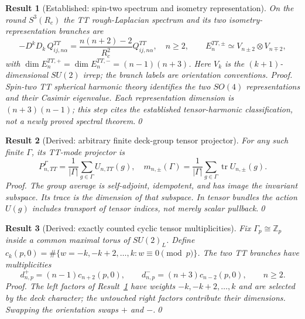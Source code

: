 \documentclass[aps,prd,onecolumn,notitlepage,groupedaddress,11pt]{revtex4-2}
\newtheorem{result}{Result}
\begin{document}
\begin{result}[\textsf{Established}: spin-two spectrum and isometry representation]\label{new:194}
On the round $S^3(R_c)$ the TT rough-Laplacian spectrum and its two isometry-representation branches are
\begin{equation}\label{eq:tt-spectrum}
 -D^kD_k\,Q^{TT}_{ij,n\alpha}=\frac{n(n+2)-2}{R_c^2}Q^{TT}_{ij,n\alpha},\quad n\ge2,\qquad
 E_n^{TT,\pm}\simeq V_{n\pm2}\otimes V_{n\mp2},
\end{equation}
with $\dim E_n^{TT,+}=\dim E_n^{TT,-}=(n-1)(n+3)$. Here $V_k$ is the $(k+1)$-dimensional $SU(2)$ irrep; the branch labels are orientation conventions. \textit{Proof.} Spin-two TT spherical harmonic theory identifies the two $SO(4)$ representations and their Casimir eigenvalue. Each representation dimension is $(n+3)(n-1)$; this step cites the established tensor-harmonic classification, not a newly proved spectral theorem.\qed
\end{result}

\begin{result}[\textsf{Derived}: arbitrary finite deck-group tensor projector]\label{new:195}
For any such finite $\Gamma$, its TT-mode projector is
\begin{equation}\label{eq:tt-proj}
 P_{n,TT}^{\Gamma}=\frac1{|\Gamma|}\sum_{g\in\Gamma}U_{n,TT}(g),\quad
 m_{n,\pm}(\Gamma)=\frac1{|\Gamma|}\sum_{g\in\Gamma}\operatorname{tr}U_{n,\pm}(g).
\end{equation}
\textit{Proof.} The group average is self-adjoint, idempotent, and has image the invariant subspace. Its trace is the dimension of that subspace. In tensor bundles the action $U(g)$ includes transport of tensor indices, not merely scalar pullback.\qed
\end{result}

\begin{result}[\textsf{Derived}: exactly counted cyclic tensor multiplicities]\label{new:196}
Fix $\Gamma_p\cong\mathbb Z_p$ inside a common maximal torus of $SU(2)_L$. Define $c_k(p,0)=\#\{w=-k,-k+2,\ldots,k:w\equiv0\pmod p\}$. The two TT branches have multiplicities
\begin{equation}\label{eq:tt-mults}
 d^{+}_{n,p}=(n-1)c_{n+2}(p,0),\qquad
 d^{-}_{n,p}=(n+3)c_{n-2}(p,0),\qquad n\ge2.
\end{equation}
\textit{Proof.} The left factors of Result~\ref{new:194} have weights $-k,-k+2,\ldots,k$ and are selected by the deck character; the untouched right factors contribute their dimensions. Swapping the orientation swaps $+$ and $-$.\qed
\end{result}
\end{document}
